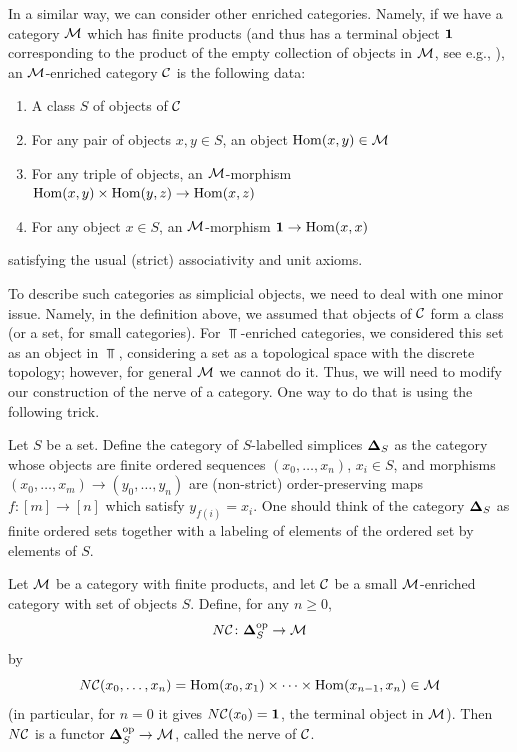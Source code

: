 In a similar way, we can consider other enriched categories. Namely, if we have
a category $\mathcal{M}$ which has finite products (and thus has a terminal object
$\mathbf{1}$ corresponding to the product of the empty collection of objects in $\mathcal{M}$, see
e.g., \cite[Section III.5]{mac-lane}), an $\mathcal{M}$-enriched category
$\mathcal{C}$ is the following data:

\begin{enumerate}
\item A class $S$ of objects of $\mathcal{C}$
\item For any pair of objects $x,y\in S$, an object
  $\operatorname{Hom}(x,y)\in \mathcal{M}$
\item For any triple of objects, an $\mathcal{M}$-morphism
      $\operatorname{Hom}(x,y)\times \operatorname{Hom}(y,z)\to \operatorname{Hom}(x,z)$
\item For any object $x\in S$, an $\mathcal{M}$-morphism $\mathbf{1} \to \operatorname{Hom}(x,x)$
\end{enumerate}
satisfying the usual (strict) associativity and unit axioms.


To describe such categories as simplicial objects, we need to deal with one
minor issue. Namely, in the definition above, we assumed that objects of $\mathcal{C}$
form a class (or a set, for small categories). For $\Top$-enriched categories,
we considered this set as an object in $\Top$, considering a set as a
topological space with the discrete topology; however, for general $\mathcal{M}$ we
cannot do it. Thus, we will need to modify our construction of the nerve of a
category. One way to do that is using the following trick.

Let $S$ be a set. Define the category of $S$-labelled simplices $\mathbf{\Delta}_S$ as
the category whose objects are finite ordered sequences $(x_0, \dots, x_n)$,
$x_i \in S$, and morphisms $(x_0, \dots, x_m)\to (y_0, \dots, y_n)$ are
(non-strict) order-preserving maps $f\colon [m]\to [n]$ which satisfy
$y_{f(i)}=x_i$. One should think of the category $\mathbf{\Delta}_S$ as finite ordered
sets together with a labeling of elements of the ordered set by elements of $S$.


\begin{definition}\label{d:nerve-enriched}
  Let $\mathcal{M}$ be a category with finite products, and let $\mathcal{C}$ be a small
  $\mathcal{M}$-enriched category with set of objects $S$. Define, for any $n\ge 0$,
  $$
    N\mathcal{C}\colon \mathbf{\Delta}_S^{\mathrm{op}}\to \mathcal{M}
  $$
  by
  $$
    N\mathcal{C}(x_0, \dots, x_n)
    =\operatorname{Hom}(x_0, x_1)\times \dots\times \operatorname{Hom}(x_{n-1}, x_n)\in \mathcal{M}
  $$
  (in particular, for $n=0$ it gives
  $N\mathcal{C} (x_0)=\mathbf{1}$, the terminal object in $\mathcal{M}$).
  Then $N\mathcal{C}$ is a functor $\mathbf{\Delta}_S^{\mathrm{op}}\to \mathcal{M}$, called the nerve of
  $\mathcal{C}$.
\end{definition}

